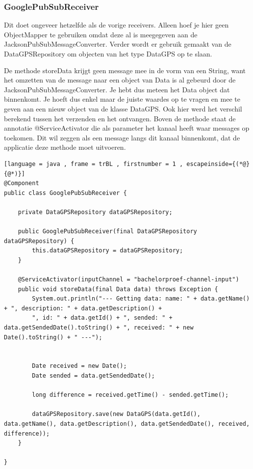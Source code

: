 \subsubsection{GooglePubSubReceiver}
Dit doet ongeveer hetzelfde als de vorige receivers. Alleen hoef je hier geen ObjectMapper te gebruiken omdat deze al is meegegeven aan de JacksonPubSubMessageConverter. Verder wordt er gebruik gemaakt van de DataGPSRepository om objecten van het type DataGPS op te slaan. 

De methode storeData krijgt geen message mee in de vorm van een String, want het omzetten van de message naar een object van Data is al gebeurd door de JacksonPubSubMessageConverter. Je hebt dus meteen het Data object dat binnenkomt. Je hoeft dus enkel maar de juiste waardes op te vragen en mee te geven aan een nieuw object van de klasse DataGPS. Ook hier werd het verschil berekend tussen het verzenden en het ontvangen. Boven de methode staat de annotatie @ServiceActivator die als parameter het kanaal heeft waar messages op toekomen. Dit wil zeggen als een message langs dit kanaal binnenkomt, dat de applicatie deze methode moet uitvoeren.
\begin{lstlisting}[language = java , frame = trBL , firstnumber = 1 , escapeinside={(*@}{@*)}]
@Component
public class GooglePubSubReceiver {
    
    private DataGPSRepository dataGPSRepository;
    
    public GooglePubSubReceiver(final DataGPSRepository dataGPSRepository) {
        this.dataGPSRepository = dataGPSRepository;
    }
    
    @ServiceActivator(inputChannel = "bachelorproef-channel-input")
    public void storeData(final Data data) throws Exception {
        System.out.println("--- Getting data: name: " + data.getName() + ", description: " + data.getDescription() +
        ", id: " + data.getId() + ", sended: " + data.getSendedDate().toString() + ", received: " + new Date().toString() + " ---");
        
        
        Date received = new Date();
        Date sended = data.getSendedDate();
        
        long difference = received.getTime() - sended.getTime();
        
        dataGPSRepository.save(new DataGPS(data.getId(), data.getName(), data.getDescription(), data.getSendedDate(), received, difference));
    }
    
}
\end{lstlisting}
